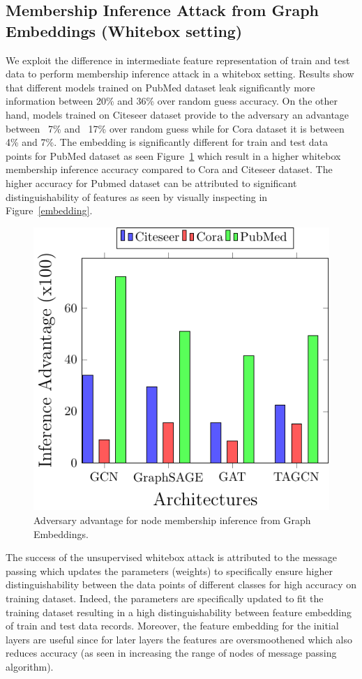 \subsection{Membership Inference Attack from Graph Embeddings {\large(Whitebox setting)}}

We exploit the difference in intermediate feature representation of train and test data to perform membership inference attack in a whitebox setting.
Results show that different models trained on PubMed dataset leak significantly more information between 20\% and 36\% over random guess accuracy.
On the other hand, models trained on Citeseer dataset provide to the adversary an advantage between ~7\% and ~17\% over random guess while for Cora dataset it is between 4\% and 7\%.
The embedding is significantly different for train and test data points for PubMed dataset as seen Figure~\ref{fig:whitebox} which result in a higher whitebox membership inference accuracy compared to Cora and Citeseer dataset.
The higher accuracy for Pubmed dataset can be attributed to significant distinguishability of features as seen by visually inspecting in Figure~\ref{embedding}.

\begin{figure}[!htb]
  \begin{center}
    \includegraphics[width=0.65\linewidth]{figures/EmbeddingMIA/whiteboxMIA.pdf}
  \end{center}
  \caption{Adversary advantage for node membership inference from Graph Embeddings.}
  \label{fig:whitebox}
\end{figure}



\noindent The success of the unsupervised whitebox attack is attributed to the message passing which updates the parameters (weights) to specifically ensure higher distinguishability between the data points of different classes for high accuracy on training dataset.
Indeed, the parameters are specifically updated to fit the training dataset resulting in a high distinguishability between feature embedding of train and test data records.
Moreover, the feature embedding for the initial layers are useful since for later layers the features are oversmoothened which also reduces accuracy (as seen in increasing the range of nodes of message passing algorithm).





